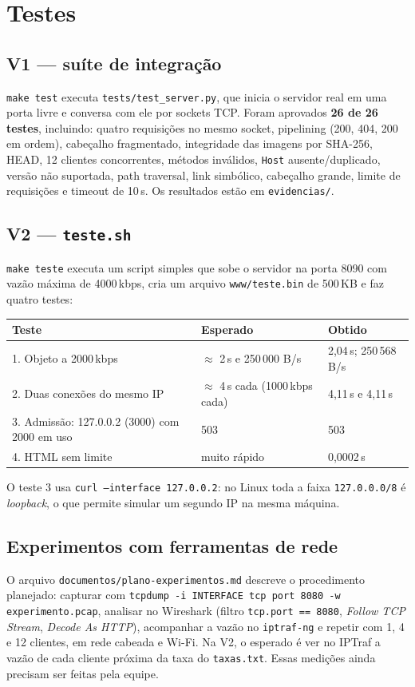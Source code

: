 \documentclass[11pt,a4paper]{article}
\begin{document}
\section{Testes}

\subsection{V1 --- suíte de integração}
\texttt{make test} executa \texttt{tests/test\_server.py}, que inicia o servidor real em uma
porta livre e conversa com ele por sockets TCP. Foram aprovados \textbf{26 de 26 testes},
incluindo: quatro requisições no mesmo socket, pipelining (200, 404, 200 em ordem),
cabeçalho fragmentado, integridade das imagens por SHA-256, HEAD, 12 clientes concorrentes,
métodos inválidos, \texttt{Host} ausente/duplicado, versão não suportada, path traversal,
link simbólico, cabeçalho grande, limite de requisições e timeout de 10\,s. Os resultados
estão em \texttt{evidencias/}.

\subsection{V2 --- \texttt{teste.sh}}
\texttt{make teste} executa um script simples que sobe o servidor na porta 8090 com vazão
máxima de 4000\,kbps, cria um arquivo \texttt{www/teste.bin} de 500\,KB e faz quatro testes:

\begin{table}[h]
\centering
\begin{tabularx}{\linewidth}{@{}lXl@{}}
\toprule
\textbf{Teste} & \textbf{Esperado} & \textbf{Obtido} \\
\midrule
1. Objeto a 2000\,kbps & $\approx$ 2\,s e 250\,000 B/s & 2,04\,s; 250\,568 B/s \\
2. Duas conexões do mesmo IP & $\approx$ 4\,s cada (1000\,kbps cada) & 4,11\,s e 4,11\,s \\
3. Admissão: 127.0.0.2 (3000) com 2000 em uso & 503 & 503 \\
4. HTML sem limite & muito rápido & 0,0002\,s \\
\bottomrule
\end{tabularx}
\end{table}

O teste 3 usa \texttt{curl --interface 127.0.0.2}: no Linux toda a faixa
\texttt{127.0.0.0/8} é \emph{loopback}, o que permite simular um segundo IP na mesma máquina.

\subsection{Experimentos com ferramentas de rede}
O arquivo \texttt{documentos/plano-experimentos.md} descreve o procedimento planejado:
capturar com \texttt{tcpdump -i INTERFACE tcp port 8080 -w experimento.pcap}, analisar no
Wireshark (filtro \texttt{tcp.port == 8080}, \emph{Follow TCP Stream}, \emph{Decode As HTTP}),
acompanhar a vazão no \texttt{iptraf-ng} e repetir com 1, 4 e 12 clientes, em rede cabeada
e Wi-Fi. Na V2, o esperado é ver no IPTraf a vazão de cada cliente próxima da taxa do
\texttt{taxas.txt}. Essas medições ainda precisam ser feitas pela equipe.
\end{document}

